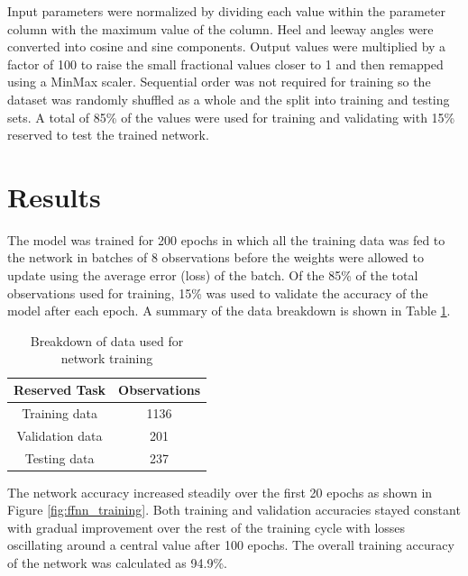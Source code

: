 \documentclass[twoside,twocolumn]{article}
\begin{document}
Input parameters were normalized by dividing each value within the parameter column with the  maximum value of the column. Heel and leeway angles were converted into cosine and sine components.  Output values were multiplied by a factor of 100 to raise the small fractional values closer to 1 and then remapped using a MinMax scaler. Sequential order was not required for training so the dataset was randomly shuffled as a whole and the split into training and testing sets. A total of 85\% of the values were used for training and validating with 15\% reserved to test the trained network. 


\section{Results}
The model was trained for 200 epochs in which all the training data was fed to the network in batches of 8 observations before the weights were allowed to update using the average error (loss) of the batch. Of the 85\% of the total observations used for training, 15\% was used to validate the accuracy of the model after each epoch. A summary of the data breakdown is shown in Table \ref{tab:data}.

\begin{table}[]
\centering
\caption{Breakdown of data used for network training}
\label{tab:data}
\begin{tabular}{@{}cc@{}}
\toprule
\textbf{Reserved Task} & \textbf{Observations} \\ \midrule
Training data & 1136 \\
Validation data & 201 \\
Testing data & 237 \\ \bottomrule
\end{tabular}
\end{table}

The network accuracy increased steadily over the first 20 epochs as shown in Figure \ref{fig:ffnn_training}. Both training and validation accuracies stayed constant with gradual improvement over the rest of the training cycle with losses oscillating around a central value after 100 epochs. The overall training accuracy of the network was calculated as 94.9\%.
 
\end{document}
